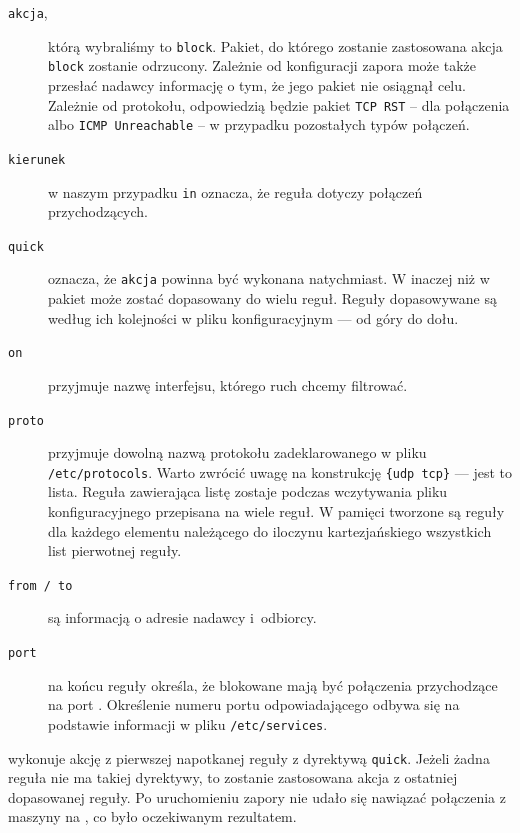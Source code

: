 \begin{description}

\item[\texttt{akcja}\textnormal{,}] którą wybraliśmy to \texttt{block}. Pakiet,
do którego zostanie zastosowana akcja \texttt{block} zostanie odrzucony.
Zależnie od konfiguracji zapora może także przesłać nadawcy informację o tym, że
jego pakiet nie osiągnął celu. Zależnie od protokołu, odpowiedzią będzie pakiet
\texttt{TCP RST} -- dla połączenia \tcp{} albo \texttt{ICMP Unreachable} -- w
przypadku pozostałych typów połączeń.

\item[\texttt{kierunek}] w naszym przypadku \texttt{in} oznacza, że reguła
dotyczy połączeń przychodzących.

\item[\texttt{quick}] oznacza, że \texttt{akcja} powinna być wykonana
natychmiast. W \pf{} inaczej niż w \ipfw{} pakiet może zostać dopasowany do
wielu reguł. Reguły dopasowywane są według ich kolejności w pliku
konfiguracyjnym --- od góry do dołu.

\item[\texttt{on}] przyjmuje nazwę interfejsu, którego ruch chcemy filtrować.

\item[\texttt{proto}] przyjmuje dowolną nazwą protokołu zadeklarowanego w pliku
\texttt{/etc/protocols}. Warto zwrócić uwagę na konstrukcję \texttt{\{udp tcp\}}
--- jest to lista. Reguła zawierająca listę zostaje podczas wczytywania pliku
konfiguracyjnego przepisana na wiele reguł. W pamięci tworzone są reguły dla
każdego elementu należącego do iloczynu kartezjańskiego wszystkich list
pierwotnej reguły.

\item[\texttt{from / to}] są informacją o adresie nadawcy i~odbiorcy.

\item[\texttt{port}] na końcu reguły określa, że blokowane mają być połączenia
przychodzące na port \ssh{}. Określenie numeru portu odpowiadającego \ssh{}
odbywa się na podstawie informacji w pliku \texttt{/etc/services}.

\end{description}

\pf{} wykonuje akcję z pierwszej napotkanej reguły z dyrektywą \texttt{quick}.
Jeżeli żadna reguła nie ma takiej dyrektywy, to zostanie zastosowana akcja z
ostatniej dopasowanej reguły. Po uruchomieniu zapory nie udało się nawiązać
połączenia \ssh{} z maszyny \volt{} na \emoip{}, co było oczekiwanym rezultatem.


